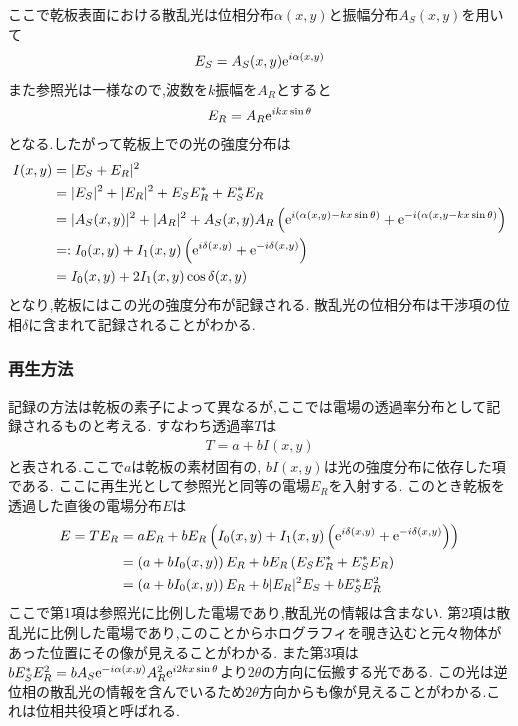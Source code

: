ここで乾板表面における散乱光は位相分布$\alpha(x,y)$と振幅分布$A_S(x,y)$を用いて
\begin{align}
  E_S=A_S(x,y){\rm e}^{i\alpha(x,y)}
\end{align}
また参照光は一様なので,波数を$k$振幅を$A_R$とすると
\begin{align}
  E_R=A_R{\rm e}^{ikx\sin\theta}
\end{align}
となる.したがって乾板上での光の強度分布は
\begin{align}
  \begin{split}
    I(x,y)&=|E_S+E_R|^2\\
    &=|E_S|^2+|E_R|^2+E_SE_R^*+E_S^*E_R\\
    &=|A_S(x,y)|^2+|A_R|^2+A_S(x,y)A_R\left({\rm e}^{i(\alpha(x,y)-kx\sin\theta)}+{\rm e}^{-i(\alpha(x,y-kx\sin\theta)}\right)\\
    &=:I_0(x,y)+I_1(x,y)\left({\rm e}^{i\delta(x,y)}+{\rm e}^{-i\delta(x,y)}\right)\\
    &=I_0(x,y)+2I_1(x,y)\cos\delta(x,y)
  \end{split}
\end{align}
となり,乾板にはこの光の強度分布が記録される.
散乱光の位相分布は干渉項の位相$\delta$に含まれて記録されることがわかる.
\subsubsection{再生方法}
記録の方法は乾板の素子によって異なるが,ここでは電場の透過率分布として記録されるものと考える.
すなわち透過率$T$は
\begin{align}
  T=a+bI(x,y)
\end{align}
と表される.ここで$a$は乾板の素材固有の,
$bI(x,y)$は光の強度分布に依存した項である.
ここに再生光として参照光と同等の電場$E_R$を入射する.
このとき乾板を透過した直後の電場分布$E$は
\begin{align}
  \begin{split}  
    E=TE_R&=aE_R+bE_R\left(I_0(x,y)+I_1(x,y)\left({\rm e}^{i\delta(x,y)}+{\rm e}^{-i\delta(x,y)}\right)\right)\\
    &=\left(a+bI_0(x,y)\right)E_R+bE_R\left(E_SE_R^*+E_S^*E_R\right)\\
    &=\left(a+bI_0(x,y)\right)E_R+b|E_R|^2E_S+bE_S^*E_R^2
  \end{split}
\end{align}
ここで第1項は参照光に比例した電場であり,散乱光の情報は含まない.
第2項は散乱光に比例した電場であり,このことからホログラフィを覗き込むと元々物体があった位置にその像が見えることがわかる.
また第3項は$bE_S^*E_R^2=bA_S{\rm e}^{-i\alpha(x,y)}A_R^2{\rm e}^{i2kx\sin\theta}$より$2\theta$の方向に伝搬する光である.
この光は逆位相の散乱光の情報を含んでいるため$2\theta$方向からも像が見えることがわかる.これは位相共役項と呼ばれる.
